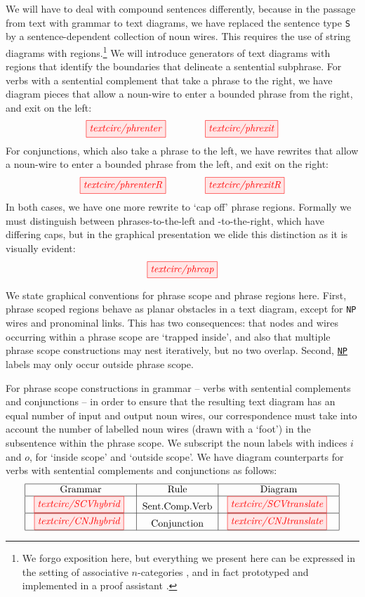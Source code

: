 We will have to deal with compound sentences differently, because in the passage from text with grammar to text diagrams, we have replaced the sentence type \texttt{S} by a sentence-dependent collection of noun wires. This requires the use of string diagrams with regions.\footnote{We forgo exposition here, but everything we present here can be expressed in the setting of associative $n$-categories \cite{dorn_associative_2018}, and in fact prototyped and implemented in a proof assistant \cite{reutter_high-level_2019}.} We will introduce  generators of text diagrams with regions that identify the boundaries that delineate a sentential subphrase. For verbs with a sentential complement that take a phrase to the right, we have diagram pieces that allow a noun-wire to enter a bounded phrase from the right, and exit on the left:
\[
\tikzfig{textcirc/phrenter} \quad\quad\quad\quad \tikzfig{textcirc/phrexit}
\]
For conjunctions, which also take a phrase to the left, we have rewrites that allow a noun-wire to enter a bounded phrase from the left, and exit on the right:
\[
\tikzfig{textcirc/phrenterR} \quad\quad\quad\quad \tikzfig{textcirc/phrexitR}
\]
In both cases, we have one more rewrite to `cap off' phrase regions. Formally we must distinguish between phrases-to-the-left and -to-the-right, which have differing caps, but in the graphical presentation we elide this distinction as it is visually evident:
\[
\tikzfig{textcirc/phrcap}
\]

\begin{convention}\label{conv:phrscope}
We state graphical conventions for phrase scope and phrase regions here. First, phrase scoped regions behave as planar obstacles in a text diagram, except for \texttt{NP} wires and pronominal links. This has two consequences: that nodes and wires occurring within a phrase scope are `trapped inside', and also that multiple phrase scope constructions may nest iteratively, but no two overlap. Second, \texttt{\underline{NP}} labels may only occur outside phrase scope.
\end{convention}

For phrase scope constructions in grammar -- verbs with sentential complements and conjunctions -- in order to ensure that the resulting text diagram has an equal number of input and output noun wires, our correspondence must take into account the number of labelled noun wires (drawn with a `foot') in the subsentence within the phrase scope. We subscript the noun labels with indices $i$ and $o$, for `inside scope' and `outside scope'. We have diagram counterparts for verbs with sentential complements and conjunctions as follows: 
\[
\begin{tabular}{|c|c|c|}
\hline
\text{Grammar} & \text{Rule} & \text{Diagram}  \\ \hline
\tikzfig{textcirc/SCVhybrid} &  \text{Sent.Comp.Verb} &\tikzfig{textcirc/SCVtranslate} \\ \hline
\tikzfig{textcirc/CNJhybrid} & \text{Conjunction} &  \tikzfig{textcirc/CNJtranslate}   \\ \hline
\end{tabular}
\]

